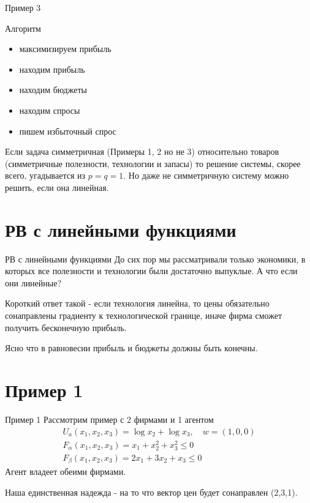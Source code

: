\documentclass{beamer}
\begin{document}
\begin{frame}{Пример 3}

Алгоритм

\begin{itemize}
  \item максимизируем прибыль
  \item находим прибыль
  \item находим бюджеты
  \item находим спросы
  \item пишем избыточный спрос
\end{itemize}

Если задача симметричная (Примеры 1, 2 но не 3) относительно товаров (симметричные полезности, технологии и запасы) то решение системы, скорее всего, угадывается из $p=q=1$. Но даже не симметричную систему можно решить, если она линейная.
\end{frame}

\section{РВ с линейными функциями}

\begin{frame}{РВ с линейными функциями}
До сих пор мы рассматривали только экономики, в которых все полезности и технологии были достаточно выпуклые. А что если они линейные?

Короткий ответ такой - если технология линейна, то цены обязательно сонаправлены градиенту к технологической границе, иначе фирма сможет получить бесконечную прибыль.

Ясно что в равновесии прибыль и бюджеты должны быть конечны.
\end{frame}

\section{Пример 1}

\begin{frame}{Пример 1}
Рассмотрим пример с 2 фирмами и 1 агентом
\begin{gather*}
	U_a(x_1, x_2, x_3) = \log x_2 + \log x_3, \quad w = (1,0,0)\\
	F_{\alpha}(x_1, x_2, x_3) = x_1 + x^2_2 + x^2_3 \leqslant 0 \\
	F_{\beta}(x_1, x_2, x_3) = 2 x_1 + 3 x_2 + x_3 \leqslant 0
\end{gather*}
Агент владеет обеими фирмами.

Наша единственная надежда - на то что вектор цен будет сонаправлен (2,3,1).
\end{frame}
\end{document}
